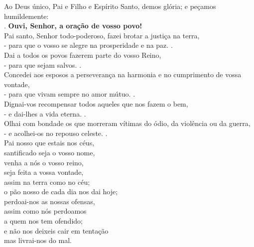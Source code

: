 \documentclass{book}
\begin{document}
\begin{center}
    Ao Deus único, Pai e Filho e Espírito Santo, demos glória; e peçamos humildemente:
    \vspace{.2cm} \\
    {\color{VioletRed1} \Rbar.} \textbf{Ouvi, Senhor, a oração de vosso povo!}
    \vspace{.2cm} \\
    Pai santo, Senhor todo-poderoso, fazei brotar a justiça na terra, \\
    - para que o vosso se alegre na prosperidade e na paz. {\color{VioletRed1} \Rbar.}
    \vspace{.2cm} \\
    Dai a todos os povos fazerem parte do vosso Reino, \\
    - para que sejam salvos. {\color{VioletRed1} \Rbar.}
    \vspace{.2cm} \\
    Concedei aos esposos a perseverança na harmonia e no cumprimento de vossa vontade, \\
    - para que vivam sempre no amor mútuo. {\color{VioletRed1} \Rbar.}
    \vspace{.2cm} \\
    Dignai-vos recompensar todos aqueles que nos fazem o bem, \\
    - e dai-lhes a vida eterna. {\color{VioletRed1} \Rbar.}
    \vspace{.2cm} \\
    Olhai com bondade os que morreram vítimas do ódio, da violência ou da guerra, \\
    - e acolhei-os no repouso celeste. {\color{VioletRed1} \Rbar.}
    \vspace{.2cm} \\
    Pai nosso que estais nos céus, \\
    santificado seja o vosso nome, \\
    venha a nós o vosso reino, \\
    seja feita a vossa vontade, \\
    assim na terra como no céu; \\
    o pão nosso de cada dia nos dai hoje; \\
    perdoai-nos as nossas ofensas, \\
    assim como nós perdoamos \\
    a quem nos tem ofendido; \\
    e não nos deixeis cair em tentação \\
    mas livrai-nos do mal.
    \vspace{.2cm} \\

\end{center}
\end{document}
